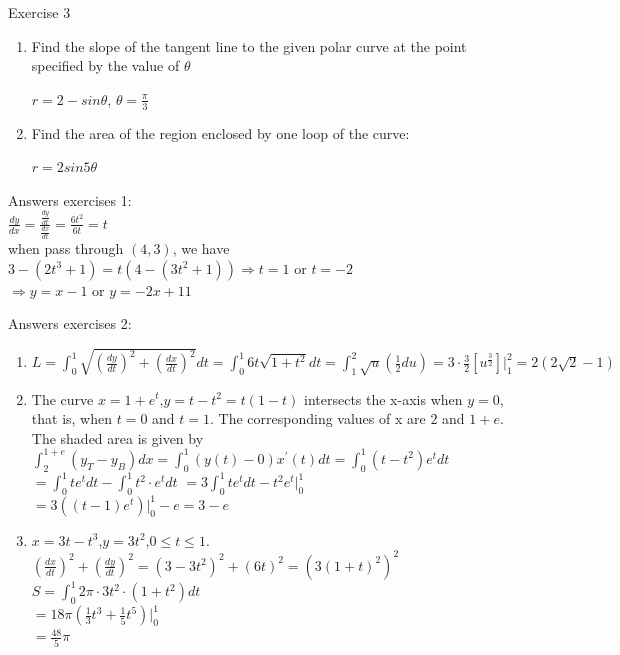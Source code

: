 \documentclass{beamer}
\begin{document}
\begin{frame}{Exercise 3 }
\begin{enumerate}
        \item Find the slope of the tangent line to the given polar curve at the point specified by the value of $\theta$
            \begin{center}
                $r=2-sin\theta$, $\theta=\frac{\pi}{3}$
            \end{center}
        \item
            Find the area of the region enclosed by one loop of the curve:
            \begin{center}
                $r=2 sin5\theta$
            \end{center}
    \end{enumerate}
\end{frame}

\begin{frame}{Answers}
    exercises 1:\\
    $\frac{dy}{dx}=\frac{\frac{dy}{dt}}{\frac{dx}{dt}}=\frac{6t^2}{6t}=t$\\
    when pass through $(4,3)$, we have $3-(2t^3+1)=t(4-(3t^2+1)) \Rightarrow t=1$ or $t=-2$\\
    $\Rightarrow y=x-1$ or $y=-2x+11$\\
\end{frame}
\begin{frame}{Answers}
    exercises 2:
    \begin{enumerate}
        \item
            $L=\int_0^1\sqrt{(\frac{dy}{dt})^2+(\frac{dx}{dt})^2} dt=\int_0^1 6t \sqrt{1+t^2}dt = \int_1^2 \sqrt{u}(\frac{1}{2}d u)= 3 \cdot \frac{3}{2} [u ^ {\frac{3}{2}}]|_1^2= 2(2\sqrt{2}-1)$
        \item
             The curve $x = 1+e^t$,$y = t−t^2=t(1-t)$ intersects the x-axis when $y = 0$, that is, when $t = 0$ and $t = 1$. The corresponding values of x are $2$ and $1+e$. The shaded area is given by
             $\int_2^{1+e} (y_T-y_B) dx = \int_0^1 (y(t)-0) x^{\prime}(t) dt=\int _0^1 (t-t^2)e^t dt $\\
             $=\int _0^1 t e^t dt - \int_0^1 t^2 \cdot e^t dt$
             $= 3\int_0^1 t e^t dt - t^2 e^t|_0^1$\\
             $=3((t-1)e^t)|_0^1 - e =3-e$
        \item
            $x=3t-t^3$,$y=3t^2$,$0 \leqslant t \leqslant 1$.\\
            $(\frac{dx}{dt})^2+(\frac{dy}{dt})^2=(3-3t^2)^2+(6t)^2=(3(1+t)^2)^2$\\
            $S=\int_0^1 2\pi \cdot 3t^2 \cdot (1+t^2) dt$\\
            $=18\pi(\frac{1}{3} t^3 + \frac{1}{5} t^5)|_0^1$\\
            $=\frac{48}{5}\pi$
    \end{enumerate}
\end{frame}
\end{document}
